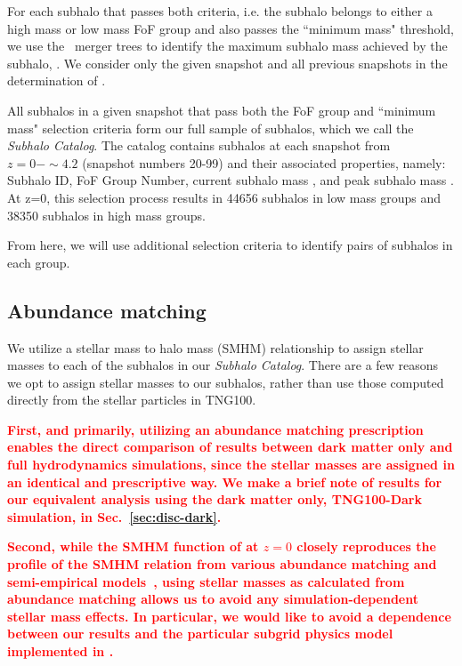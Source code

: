 \documentclass[linenumbers,twocolumn]{aastex631}
\newcommand{\add}[1]{\textcolor{red}{\textbf{#1}}}
\newcommand{\subcat}{\textit{Subhalo Catalog}}
\begin{document}
    For each subhalo that passes both criteria, i.e. the subhalo belongs to either a high mass or low mass FoF group and also passes the ``minimum mass" threshold, we use the \sublink\ merger trees to identify the maximum subhalo mass achieved by the subhalo, \Mpeak. 
    We consider only the given snapshot and all previous snapshots in the determination of \Mpeak.

    All subhalos in a given snapshot that pass both the FoF group and ``minimum mass" selection criteria form our full sample of subhalos, which we call the \subcat. 
    The catalog contains subhalos at each snapshot from $z=0-\sim4.2$ (snapshot numbers 20-99) and their associated properties, namely: Subhalo ID, FoF Group Number, current subhalo mass \Mhalo, and peak subhalo mass \Mpeak. 
    At z=0, this selection process results in 44656 subhalos in low mass groups and 38350 subhalos in high mass groups.   
    
    From here, we will use additional selection criteria to identify pairs of subhalos in each group.

    \subsection{Abundance matching} \label{sec:methods-am}
    We utilize a stellar mass to halo mass (SMHM) relationship to assign stellar masses to each of the subhalos in our \subcat.  
    There are a few reasons we opt to assign stellar masses to our subhalos, rather than use those computed directly from the stellar particles in TNG100.

    
    \add{First, and primarily, utilizing an abundance matching prescription enables the direct comparison of results between dark matter only and full hydrodynamics simulations, since the stellar masses are assigned in an identical and prescriptive way. 
    We make a brief note of results for our equivalent analysis using the dark matter only, TNG100-Dark simulation, in Sec.~\ref{sec:disc-dark}.}
    
    \add{Second, while the SMHM function of \tng{} at $z=0$ closely reproduces the profile of the SMHM relation from various abundance matching and semi-empirical models~\citep{TNG5,Nelson2019}, using stellar masses as calculated from abundance matching allows us to avoid any simulation-dependent stellar mass effects.
    In particular, we would like to avoid a dependence between our results and the particular subgrid physics model implemented in \tng{}.}
    
\end{document}
